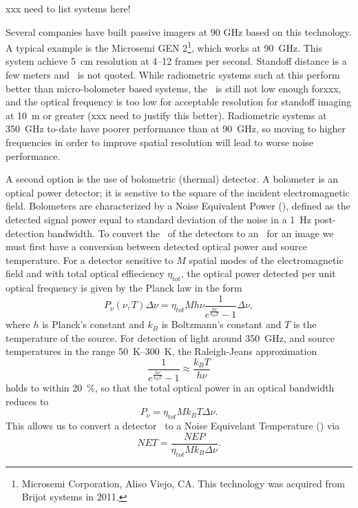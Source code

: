 xxx need to list systems here!

Several companies have built passive imagers at 90 GHz based on this technology.
A typical example is the Microsemi GEN 2\footnote{%
Microsemi Corporation, Aliso Viejo, CA. This technology was acquired from Brijot systems in 2011.}, which works at \SI{90}{\GHz}.
This system achieve \SI{5}{\cm} resolution at 4--12 frames per second.
Standoff distance is a few meters and \NETD\ is not quoted.
While radiometric systems such at this perform better than micro-bolometer based systems, the \NETD\ is still not low enough forxxx, and the optical frequency is too low for acceptable resolution for standoff imaging at \SI{10}{\m} or greater (xxx need to justify this better).
Radiometric systems at \SI{350}{\GHz} to-date have poorer performance than at \SI{90}{\GHz}, so moving to higher frequencies in order to improve spatial resolution will lead to worse noise performance.

A second option is the use of bolometric (thermal) detector.
A bolometer is an optical power detector; it is senstive to the square of the incident electromagnetic field.
Bolometers are characterized by a Noise Equivalent Power (\NEP), defined as the detected signal power equal to standard deviation of the noise in a \SI{1}{\Hz} post-detection bandwidth.
To convert the \NEP\ of the detectors to an \NETD\ for an image we must first have a conversion between detected optical power and source temperature.
For a detector sensitive to $M$ spatial modes of the electromagnetic field and with total optical effieciency $\eta_{tot}$, the optical power detected per unit optical frequency is given by the Planck law in the form
\begin{equation} \label{eqn:ch1-planck}
  P_{\nu}(\nu,T) \Delta \nu = \eta_{tot} M h \nu \frac{1}{e^{\frac{h \nu}{k_B T}} - 1} \Delta \nu,
\end{equation}
where $h$ is Planck's constant and $k_B$ is Boltzmann's constant and $T$ is the temperature of the source.
For detection of light around \SI{350}{\GHz}, and source temperatures in the range \SIrange{50}{300}{\K}, the Raleigh-Jeans approximation
\begin{equation}
  \frac{1}{e^{\frac{h \nu}{k_B T}} - 1} \approx \frac{k_B T}{h \nu}
\end{equation}
holds to within \SI{20}{\percent}, so that the total optical power in an optical bandwidth reduces to 
\begin{equation}
  P_{\nu} = \eta_{tot} M k_B T \Delta \nu.
\end{equation}
This allows us to convert a detector \NEP\ to a Noise Equivelant Temperature (\NET) via
\begin{equation}
  NET = \frac{NEP}{\eta_{tot} M k_B \Delta \nu}.
\end{equation}

